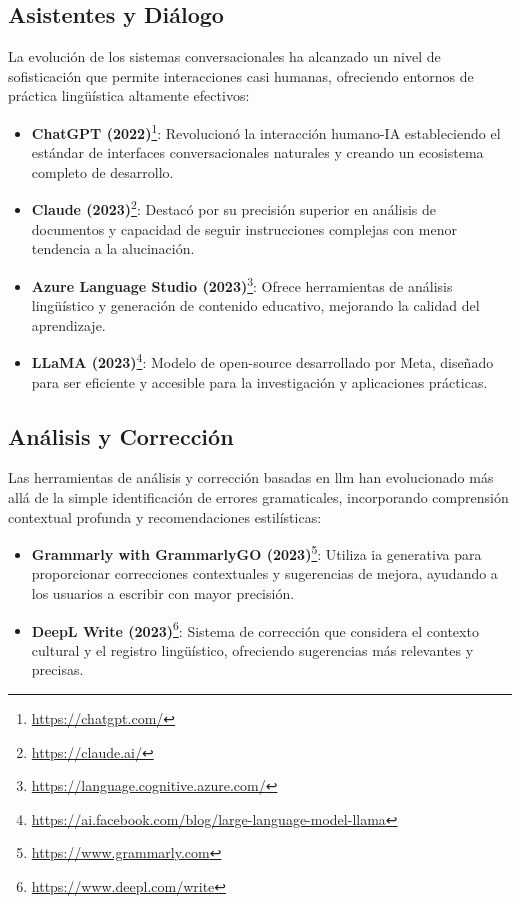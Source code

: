 \subsection{Asistentes y Diálogo}
\label{subsec:asistentes-dialogo}

La evolución de los sistemas conversacionales ha alcanzado un nivel de sofisticación que permite interacciones casi humanas, ofreciendo entornos de práctica lingüística altamente efectivos:


\begin{itemize}
  \item \textbf{ChatGPT (2022)}\footnote{\url{https://chatgpt.com/}}: Revolucionó la interacción humano-IA estableciendo el estándar de interfaces conversacionales naturales y creando un ecosistema completo de desarrollo.
  \item \textbf{Claude (2023)}\footnote{\url{https://claude.ai/}}: Destacó por su precisión superior en análisis de documentos y capacidad de seguir instrucciones complejas con menor tendencia a la alucinación.
  \item \textbf{Azure Language Studio (2023)}\footnote{\url{https://language.cognitive.azure.com/}}: Ofrece herramientas de análisis lingüístico y generación de contenido educativo, mejorando la calidad del aprendizaje.
  \item \textbf{LLaMA (2023)}\footnote{\url{https://ai.facebook.com/blog/large-language-model-llama}}: Modelo de \gls{open-source} desarrollado por Meta, diseñado para ser eficiente y accesible para la investigación y aplicaciones prácticas.
\end{itemize}

\subsection{Análisis y Corrección}
\label{subsec:analisis-correccion}

Las herramientas de análisis y corrección basadas en \gls{llm} han evolucionado más allá de la simple identificación de errores gramaticales, incorporando comprensión contextual profunda y recomendaciones estilísticas:


\begin{itemize}
  \item \textbf{Grammarly with GrammarlyGO (2023)}\footnote{\url{https://www.grammarly.com}}: Utiliza \gls{ia} generativa para proporcionar correcciones contextuales y sugerencias de mejora, ayudando a los usuarios a escribir con mayor precisión.
  \item \textbf{DeepL Write (2023)}\footnote{\url{https://www.deepl.com/write}}: Sistema de corrección que considera el contexto cultural y el registro lingüístico, ofreciendo sugerencias más relevantes y precisas.
\end{itemize}

